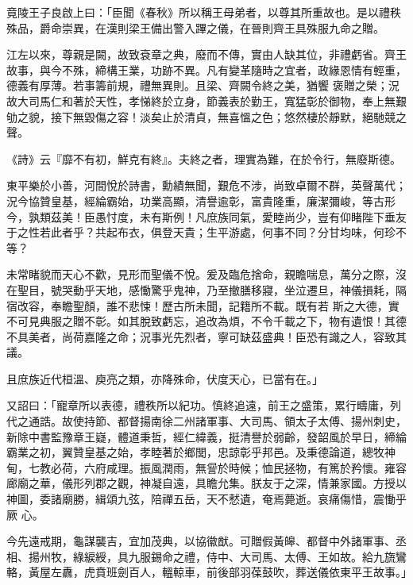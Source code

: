 \begin{pinyinscope}
 竟陵王子良啟上曰：「臣聞《春秋》所以稱王母弟者，以尊其所重故也。是以禮秩殊品，爵命崇異，在漢則梁王備出警入蹕之儀，在晉則齊王具殊服九命之贈。



 江左以來，尊親是闕，故致袞章之典，廢而不傳，實由人缺其位，非禮虧省。齊王故事，與今不殊，締構王業，功跡不異。凡有變革隨時之宜者，政緣恩情有輕重，德義有厚薄。若事籌前規，禮無異則。且梁、齊闕令終之美，猶饗
 褒贈之榮；況故大司馬仁和著於天性，孝悌終於立身，節義表於勤王，寬猛彰於御物，奉上無艱劬之貌，接下無毀傷之容！淡矣止於清貞，無喜慍之色；悠然棲於靜默，絕馳競之聲。



 《詩》云『靡不有初，鮮克有終』。夫終之者，理實為難，在於令行，無廢斯德。



 東平樂於小善，河間悅於詩書，勳績無聞，艱危不涉，尚致卓爾不群，英聲萬代；況今協贊皇基，經綸霸始，功業高顯，清譽逾彰，富貴隆重，廉潔彌峻，等古形今，孰類茲美！臣愚忖度，未有斯例！凡庶族同氣，愛睦尚少，豈有仰睹陛下垂友于之性若此者乎？共起布衣，俱登天貴；生平游處，何事不同？分甘均味，何珍不等？



 未常睹貌而天心不歡，見形而聖儀不悅。爰及臨危捨命，親瞻喘息，萬分之際，沒在聖目，號哭動乎天地，感慟驚乎鬼神，乃至撤膳移寢，坐泣遷旦，神儀損耗，隔宿改容，奉瞻聖顏，誰不悲悚！歷古所未聞，記籍所不載。既有若
 斯之大德，實不可見典服之贈不彰。如其脫致虧忘，追改為煩，不令千載之下，物有遺恨！其德不具美者，尚荷嘉隆之命；況事光先烈者，寧可缺茲盛典！臣恐有識之人，容致其議。



 且庶族近代桓溫、庾亮之類，亦降殊命，伏度天心，已當有在。」



 又詔曰：「寵章所以表德，禮秩所以紀功。慎終追遠，前王之盛策，累行疇庸，列代之通誥。故使持節、都督揚南徐二州諸軍事、大司馬、領太子太傅、揚州刺史，新除中書監豫章王嶷，體道秉哲，經仁緯義，挺清譽於弱齡，發韶風於早日，締綸霸業之初，翼贊皇基之始，孝睦著於鄉閭，忠諒彰乎邦邑。及秉德論道，總牧神甸，七教必荷，六府咸理。振風潤雨，無諐於時候；恤民拯物，有篤於矜懷。雍容廊廟之華，儀形列郡之觀，神凝自遠，具瞻允集。朕友于之深，情兼家國。方授以神圖，委諸廟勝，緝頌九弦，陪禪五岳，天不憖遺，奄焉薨逝。哀痛傷惜，震慟乎厥
 心。



 今先遠戒期，龜謀襲吉，宜加茂典，以協徽猷。可贈假黃皞、都督中外諸軍事、丞相、揚州牧，綠綟綬，具九服錫命之禮，侍中、大司馬、太傅、王如故。給九旒鸞輅，黃屋左纛，虎賁班劍百人，轀輬車，前後部羽葆鼓吹，葬送儀依東平王故事。」




\end{pinyinscope}
